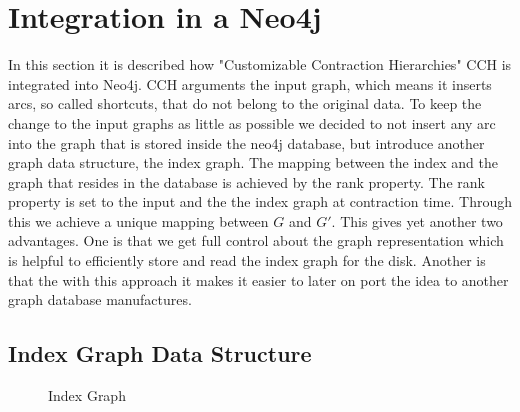 \chapter{Integration in a Neo4j}

In this section it is described how "Customizable Contraction Hierarchies" CCH is integrated into Neo4j. CCH arguments the input graph, which means it inserts arcs, so called shortcuts, that do not belong to the original data. To keep the change to the input graphs as little as possible we decided to not insert any arc into the graph that is stored inside the neo4j database, but introduce another graph data structure, the index graph. 
The mapping between the index and the graph that resides in the database is achieved by the rank property. The rank property is set to the input and the the index graph at contraction time. Through this we achieve a unique mapping between $G$ and $G'$.
This gives yet another two advantages. One is that we get full control about the graph representation which is helpful to efficiently store and read the index graph for the disk. Another is that the with this approach it makes it easier to later on port the idea to another graph database manufactures.

\section{Index Graph Data Structure}\label{sec:index_graph}

\begin{figure}
     
    
    \caption{Index Graph}
    \label{uml:index_graph}
\end{figure}


